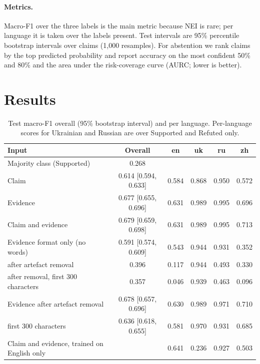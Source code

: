 \documentclass[11pt,a4paper]{article}
\begin{document}
\paragraph{Metrics.} Macro-F1 over the three labels is the main metric because NEI is rare; per language it is taken
over the labels present. Test intervals are 95\% percentile bootstrap intervals over claims (1,000 resamples). For
abstention we rank claims by the top predicted probability and report accuracy on the most confident 50\% and 80\%
and the area under the risk-coverage curve (AURC; lower is better).

\section{Results}

\begin{table}[t]
\centering\small
\caption{Test macro-F1 overall (95\% bootstrap interval) and per language. Per-language scores for Ukrainian and
Russian are over Supported and Refuted only.}
\label{tab:main}
\setlength{\tabcolsep}{4pt}
\begin{tabular}{lccccc}
\toprule
Input & Overall & en & uk & ru & zh \\
\midrule
Majority class (Supported) & 0.268 & & & & \\
Claim & 0.614 [0.594, 0.633] & 0.584 & 0.868 & 0.950 & 0.572 \\
Evidence & 0.677 [0.655, 0.696] & 0.631 & 0.989 & 0.995 & 0.696 \\
Claim and evidence & 0.679 [0.659, 0.698] & 0.631 & 0.989 & 0.995 & 0.713 \\
\midrule
Evidence format only (no words) & 0.591 [0.574, 0.609] & 0.543 & 0.944 & 0.931 & 0.352 \\
\quad after artefact removal & 0.396 & 0.117 & 0.944 & 0.493 & 0.330 \\
\quad after removal, first 300 characters & 0.357 & 0.046 & 0.939 & 0.463 & 0.096 \\
\midrule
Evidence after artefact removal & 0.678 [0.657, 0.696] & 0.630 & 0.989 & 0.971 & 0.710 \\
\quad first 300 characters & 0.636 [0.618, 0.655] & 0.581 & 0.970 & 0.931 & 0.685 \\
\midrule
Claim and evidence, trained on English only & & 0.641 & 0.236 & 0.927 & 0.503 \\
\bottomrule
\end{tabular}
\end{table}
\end{document}
